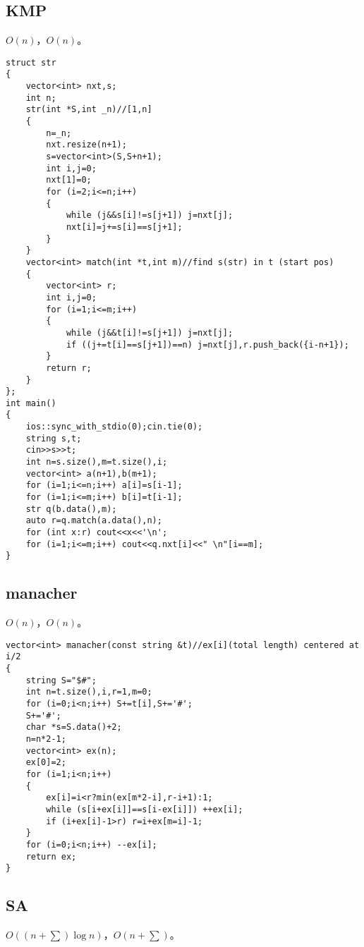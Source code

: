 \documentclass{ctexart}
\begin{document}
\subsection{KMP}

$O(n)$，$O(n)$。

\begin{lstlisting}
struct str
{
	vector<int> nxt,s;
	int n;
	str(int *S,int _n)//[1,n]
	{
		n=_n;
		nxt.resize(n+1);
		s=vector<int>(S,S+n+1);
		int i,j=0;
		nxt[1]=0;
		for (i=2;i<=n;i++)
		{
			while (j&&s[i]!=s[j+1]) j=nxt[j];
			nxt[i]=j+=s[i]==s[j+1];
		}
	}
	vector<int> match(int *t,int m)//find s(str) in t (start pos)
	{
		vector<int> r;
		int i,j=0;
		for (i=1;i<=m;i++)
		{
			while (j&&t[i]!=s[j+1]) j=nxt[j];
			if ((j+=t[i]==s[j+1])==n) j=nxt[j],r.push_back({i-n+1});
		}
		return r;
	}
};
int main()
{
	ios::sync_with_stdio(0);cin.tie(0);
	string s,t;
	cin>>s>>t;
	int n=s.size(),m=t.size(),i;
	vector<int> a(n+1),b(m+1);
	for (i=1;i<=n;i++) a[i]=s[i-1];
	for (i=1;i<=m;i++) b[i]=t[i-1];
	str q(b.data(),m);
	auto r=q.match(a.data(),n);
	for (int x:r) cout<<x<<'\n';
	for (i=1;i<=m;i++) cout<<q.nxt[i]<<" \n"[i==m];
}

\end{lstlisting}

\subsection{manacher}

$O(n)$，$O(n)$。

\begin{lstlisting}
vector<int> manacher(const string &t)//ex[i](total length) centered at i/2
{
	string S="$#";
	int n=t.size(),i,r=1,m=0;
	for (i=0;i<n;i++) S+=t[i],S+='#';
	S+='#';
	char *s=S.data()+2;
	n=n*2-1;
	vector<int> ex(n);
	ex[0]=2;
	for (i=1;i<n;i++)
	{
		ex[i]=i<r?min(ex[m*2-i],r-i+1):1;
		while (s[i+ex[i]]==s[i-ex[i]]) ++ex[i];
		if (i+ex[i]-1>r) r=i+ex[m=i]-1;
	}
	for (i=0;i<n;i++) --ex[i];
	return ex;
}
\end{lstlisting}

\subsection{SA}

$O((n+\sum)\log n)$，$O(n+\sum)$。
\end{document}
